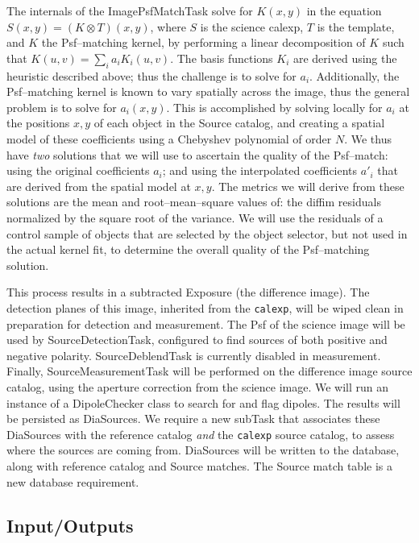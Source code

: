 \documentclass[12pt]{article}
\begin{document}
The internals of the ImagePsfMatchTask solve for $K(x,y)$ in the
equation $S(x,y) = (K \otimes T)(x,y)$, where $S$ is the science
calexp, $T$ is the template, and $K$ the Psf--matching kernel, by
performing a linear decomposition of $K$ such that $K(u,v) = \sum_i
a_i K_i(u,v)$.  The basis functions $K_i$ are derived using the
heuristic described above; thus the challenge is to solve for $a_i$.
Additionally, the Psf--matching kernel is known to vary spatially
across the image, thus the general problem is to solve for $a_i(x,y)$.
This is accomplished by solving locally for $a_i$ at the positions
$x,y$ of each object in the Source catalog, and creating a spatial
model of these coefficients using a Chebyshev polynomial of order $N$.
We thus have {\it two} solutions that we will use to ascertain the
quality of the Psf--match: using the original coefficients $a_i$; and
using the interpolated coefficients $a{'}_i$ that are derived from the
spatial model at $x,y$.  The metrics we will derive from these
solutions are the mean and root--mean--square values of: the diffim
residuals normalized by the square root of the variance.  We will use
the residuals of a control sample of objects that are selected by the
object selector, but not used in the actual kernel fit, to determine
the overall quality of the Psf--matching solution.

This process results in a subtracted Exposure (the difference image).
The detection planes of this image, inherited from the {\tt calexp},
will be wiped clean in preparation for detection and measurement.  The
Psf of the science image will be used by SourceDetectionTask,
configured to find sources of both positive and negative polarity.
SourceDeblendTask is currently disabled in measurement.  Finally,
SourceMeasurementTask will be performed on the difference image source
catalog, using the aperture correction from the science image.  We
will run an instance of a DipoleChecker class to search for and flag
dipoles.  The results will be persisted as DiaSources.  We require a
new subTask that associates these DiaSources with the reference
catalog {\it and} the {\tt calexp} source catalog, to assess where the
sources are coming from.  DiaSources will be written to the database,
along with reference catalog and Source matches.  The Source match
table is a new database requirement.

\subsection{Input/Outputs}
\end{document}

